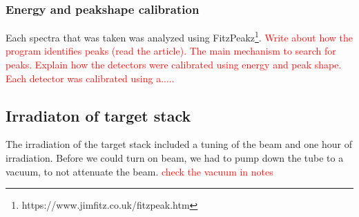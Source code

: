 \documentclass[a4paper,11pt,twoside]{book}
\begin{document}

\noindent 
\subsubsection{Energy and peakshape calibration}
Each spectra that was taken was analyzed using FitzPeakz\footnote{https://www.jimfitz.co.uk/fitzpeak.htm}. \textcolor{red}{Write about how the program identifies peaks (read the article). The main mechanism  to search for peaks.  Explain how the detectors were calibrated using energy and peak shape. Each detector was calibrated using a..... }


\subsection{Irradiaton of target stack}
The irradiation of the target stack included a tuning of the beam and one hour of irradiation. Before we could turn on beam, we had to pump down the tube to a vacuum, to not attenuate the beam. \textcolor{red}{check the vacuum in notes}
\end{document}
